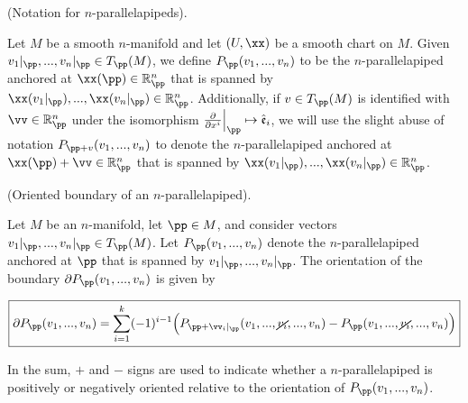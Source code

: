 \begin{defn}
    (Notation for $n$-parallelapipeds).
    
    Let $M$ be a smooth $n$-manifold and let $(U, \xx)$ be a smooth chart on $M$. Given ${v_1|_\pp, ..., v_n|_\pp \in T_\pp(M)}$, we define $P_\pp(v_1, ..., v_n)$ to be the $n$-parallelapiped anchored at $\xx(\pp) \in \R^n_\pp$ that is spanned by \\ ${\xx(v_1|_\pp), ..., \xx(v_n|_\pp) \in \R^n_\pp}$. Additionally, if $v \in T_\pp(M)$ is identified with $\vv \in \R^n_\pp$ under the isomorphism ${\frac{\pd}{\pd x^i}\Big|_\pp \mapsto \see_i}$, we will use the slight abuse of notation $P_{\pp + v}(v_1, ..., v_n)$ to denote the $n$-parallelapiped anchored at $\xx(\pp) + \vv \in \R^n_\pp$ that is spanned by $\xx(v_1|_\pp), ..., \xx(v_n|_\pp) \in \R^n_\pp$.
\end{defn}

\begin{theorem}
\label{ch::manifolds::thm::oriented_bdy_parallelapiped}

     (Oriented boundary of an $n$-parallelapiped).
    
    Let $M$ be an $n$-manifold, let $\pp \in M$, and consider vectors $v_1|_\pp, ..., v_n|_\pp \in T_\pp(M)$. Let $P_\pp(v_1, ..., v_n)$ denote the $n$-parallelapiped anchored at $\pp$ that is spanned by $v_1|_\pp, ..., v_n|_\pp$. The orientation of the boundary $\pd P_\pp(v_1, ..., v_n)$ is given by 
    
    \begin{align*}
        \boxed
        {
            \pd P_\pp(v_1, ..., v_n) = \sum_{i = 1}^k (-1)^{i - 1} \Big( P_{\pp + \vv_i|_\pp}(v_1, ..., \cancel{v_i}, ..., v_n) - P_{\pp}(v_1, ..., \cancel{v_i}, ..., v_n) \Big)
        }
    \end{align*}
    
    In the sum, $+$ and $-$ signs are used to indicate whether a $n$-parallelapiped is positively or negatively oriented relative to the orientation of $P_\pp(v_1, ..., v_n)$.
\end{theorem}

